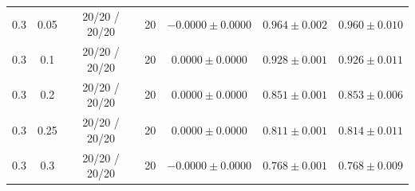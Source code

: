 \begin{tabular}{ccccccc}
0.3 & 0.05 & 20/20 / 20/20 & 20 & $-0.0000 \pm 0.0000$ & $0.964 \pm 0.002$ & $0.960 \pm 0.010$ \\
0.3 & 0.1 & 20/20 / 20/20 & 20 & $0.0000 \pm 0.0000$ & $0.928 \pm 0.001$ & $0.926 \pm 0.011$ \\
0.3 & 0.2 & 20/20 / 20/20 & 20 & $0.0000 \pm 0.0000$ & $0.851 \pm 0.001$ & $0.853 \pm 0.006$ \\
0.3 & 0.25 & 20/20 / 20/20 & 20 & $0.0000 \pm 0.0000$ & $0.811 \pm 0.001$ & $0.814 \pm 0.011$ \\
0.3 & 0.3 & 20/20 / 20/20 & 20 & $-0.0000 \pm 0.0000$ & $0.768 \pm 0.001$ & $0.768 \pm 0.009$ \\
\hline\end{tabular}
